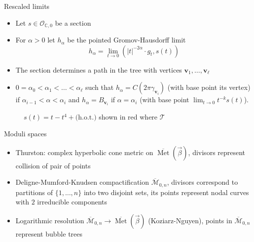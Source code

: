 \documentclass{beamer}
\newcommand{\C}{\mathbb{C}}
\newcommand{\mM}{\mathcal{M}}
\DeclareMathOperator{\Met}{Met}
\begin{document}
\begin{frame}{Rescaled limits}
	\begin{itemize}
		\item Let \(s \in \mathcal{O}_{\C, 0}\) be a section
		\item For \(\alpha>0\) let \(h_{\alpha}\) be the pointed Gromov-Hausdorff limit 
		\[h_{\alpha} = \lim_{t \to 0} (|t|^{-2\alpha} \cdot g_t, s(t))\]
		\item The section determines a path in the tree with vertices \(\mathbf{v}_1, \ldots, \mathbf{v}_{\ell}\)
		\item  \(0= \alpha_0 < \alpha_1 < \ldots < \alpha_{\ell}\) such that \(h_{\alpha} = C(2\pi \gamma_{\mathbf{v}_i})\) (with base point its vertex) if \(\alpha_{i-1} < \alpha < \alpha_i\) and \(h_{\alpha} = B_{\mathbf{v}_i}\) if \(\alpha=\alpha_i\) (with base point \(\lim_{t \to 0} t^{-k}s(t)\)).
	\end{itemize}
	
	\begin{figure}[h]
		\centering
		\caption{$s(t) = t - t^4 + \text{(h.o.t.)}$ shown in red where \(\mathcal{T}\)}
		\label{fig:polytreepath}
	\end{figure}
	
\end{frame}

\begin{frame}{Moduli spaces}
	\begin{itemize}
		\setlength{\itemsep}{\fill}
		\item Thurston: complex hyperbolic cone metric on \(\overline{\Met}(\vec{\beta})\), divisors represent collision of pair of points
		\item Deligne-Mumford-Knudsen compactification \(\overline{\mM}_{0,n}\), divisors correspond to partitions of \(\{1, \ldots, n\}\) into two disjoint sets, its points represent nodal curves with \(2\) irreducible components
		\item Logarithmic resolution \(\overline{\mM}_{0,n} \to \overline{\Met}(\vec{\beta})\) (Koziarz-Nguyen), points in \(\overline{\mM}_{0,n}\) represent bubble trees
	\end{itemize}
\end{frame}
\end{document}
